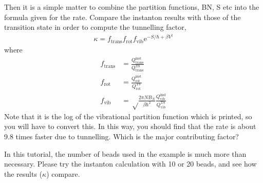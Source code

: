 \documentclass{article}
\begin{document}
\begin{Exercise}[label={post},title={Postprocessing for the rate calculation}]
Then it is a simple matter to combine the partition functions, BN, S etc into the formula given for the rate.
Compare the instanton results with those of the transition state in order to compute the tunnelling factor,
\begin{align}
	\kappa = 
		f_\text{trans} f_\text{rot} f_\text{vib}
		\mathrm{e}^{-S/\hbar+\beta V^\ddag}
\end{align}
where
\begin{align}
	f_\text{trans} &= \frac{Q_\text{trans}^\text{inst}}{Q_\text{trans}^\text{TS}} \\
	f_\text{rot} &= \frac{Q_\text{rot}^\text{inst}}{Q_\text{rot}^\text{TS}} \\
	f_\text{vib} &= \sqrt\frac{2\pi NB_N}{\beta \hbar^2} \frac{Q_\text{vib}^\text{inst}}{Q_\text{vib}^\text{TS}}
\end{align}
Note that it is the log of the vibrational partition function which is printed, so you will have to convert this. 
In this way, you should find that the rate is about 9.8 times faster due to tunnelling.
Which is the major contributing factor?

\Question
In this tutorial, the number of beads used in the example is much more than necessary.
Please try the instanton calculation with 10 or 20 beads, and see how the results ($\kappa$) compare.

\end{Exercise}




\end{document}
